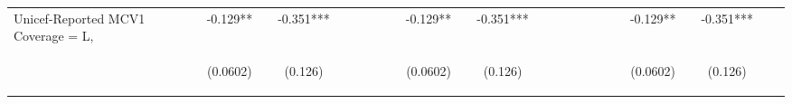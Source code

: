 \documentclass[]{article}
\begin{document}
\begin{center}
\begin{tabular}{lcccccccccccccccccccccccc}
Unicef-Reported MCV1 Coverage = L, &  & -0.129** &  & -0.351*** &  &  &  &  &  & -0.129** &  & -0.351*** &  &  &  &  &  &  &  & -0.129** &  & -0.351*** &  &  \\
\vspace{4pt} & \begin{footnotesize}\end{footnotesize} & \begin{footnotesize}(0.0602)\end{footnotesize} & \begin{footnotesize}\end{footnotesize} & \begin{footnotesize}(0.126)\end{footnotesize} & \begin{footnotesize}\end{footnotesize} & \begin{footnotesize}\end{footnotesize} & \begin{footnotesize}\end{footnotesize} & \begin{footnotesize}\end{footnotesize} & \begin{footnotesize}\end{footnotesize} & \begin{footnotesize}(0.0602)\end{footnotesize} & \begin{footnotesize}\end{footnotesize} & \begin{footnotesize}(0.126)\end{footnotesize} & \begin{footnotesize}\end{footnotesize} & \begin{footnotesize}\end{footnotesize} & \begin{footnotesize}\end{footnotesize} & \begin{footnotesize}\end{footnotesize} & \begin{footnotesize}\end{footnotesize} & \begin{footnotesize}\end{footnotesize} & \begin{footnotesize}\end{footnotesize} & \begin{footnotesize}(0.0602)\end{footnotesize} & \begin{footnotesize}\end{footnotesize} & \begin{footnotesize}(0.126)\end{footnotesize} & \begin{footnotesize}\end{footnotesize} & \begin{footnotesize}\end{footnotesize} \\

\end{tabular}
\end{center}
\end{document}

